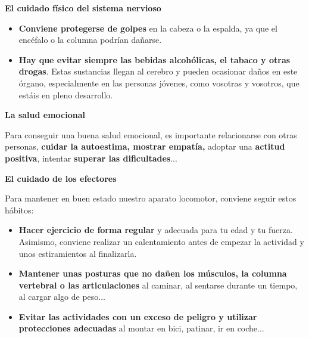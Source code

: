 \vspace{3mm}
\textbf{El cuidado físico del sistema nervioso}

\begin{itemize}
    \item \textbf{Conviene protegerse de golpes} en la cabeza o la espalda, ya que el encéfalo o la columna podrían dañarse.
    \item \textbf{Hay que evitar siempre las bebidas alcohólicas, el tabaco y otras drogas}. Estas sustancias llegan al cerebro y pueden ocasionar daños en este órgano, especialmente en las personas jóvenes, como vosotras y vosotros, que estáis en pleno desarrollo.
\end{itemize}

\textbf{La salud emocional}

\vspace{3mm}
Para conseguir una buena salud emocional, es importante relacionarse con otras personas, \textbf{cuidar la autoestima, mostrar empatía,} adoptar una \textbf{actitud positiva}, intentar \textbf{superar las dificultades}...

\vspace{3mm}
\textbf{El cuidado de los efectores}

\vspace{3mm}
Para mantener en buen estado nuestro aparato locomotor, conviene seguir estos hábitos:

\begin{itemize}
    \item \textbf{Hacer ejercicio de forma regular} y adecuada para tu edad y tu fuerza. Asimismo, conviene realizar un calentamiento antes de empezar la actividad y unos estiramientos al finalizarla.
    \item \textbf{Mantener unas posturas que no dañen los músculos, la columna vertebral o las articulaciones} al caminar, al sentarse durante un tiempo, al cargar algo de peso...
    \item \textbf{Evitar las actividades con un exceso de peligro y utilizar protecciones adecuadas} al montar en bici, patinar, ir en coche...
\end{itemize}